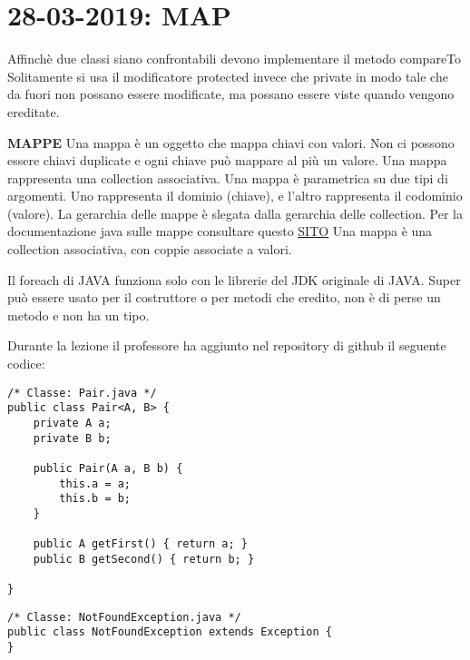 

\newpage
\section{28-03-2019: MAP}
\noindent Affinchè due classi siano confrontabili devono implementare il metodo compareTo \newline
Solitamente si usa il modificatore protected invece che private in modo tale che da fuori non possano essere modificate, ma possano essere viste quando vengono ereditate. \newline

\noindent \textbf{MAPPE}\newline
Una mappa è un oggetto che mappa chiavi con valori. Non ci possono essere chiavi duplicate e ogni chiave può mappare al più un valore. \newline
Una mappa rappresenta una collection associativa. \newline
Una mappa è parametrica su due tipi di argomenti. Uno rappresenta il dominio (chiave), e l'altro rappresenta il codominio (valore). La gerarchia delle mappe è slegata dalla gerarchia delle collection. \newline
Per la documentazione java sulle mappe consultare questo \href{https://docs.oracle.com/javase/8/docs/api/java/util/Map.html }{SITO} \newline
Una mappa è una collection associativa, con coppie associate a valori.

\noindent Il foreach di JAVA funziona solo con le librerie del JDK originale di JAVA.\newline
Super può essere usato per il costruttore o per metodi che eredito, non è di perse un metodo e non ha un tipo.

\noindent Durante la lezione il professore ha aggiunto nel repository di github il seguente codice: 


\begin{lstlisting}[basicstyle=\small,]
/* Classe: Pair.java */
public class Pair<A, B> {
    private A a;
    private B b;

    public Pair(A a, B b) {
        this.a = a;
        this.b = b;
    }

    public A getFirst() { return a; }
    public B getSecond() { return b; }

}
\end{lstlisting}

\begin{lstlisting}[basicstyle=\small,]
/* Classe: NotFoundException.java */
public class NotFoundException extends Exception {
}
\end{lstlisting}

